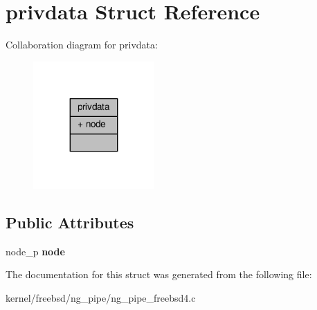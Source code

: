 \hypertarget{structprivdata}{\section{privdata Struct Reference}
\label{structprivdata}
}


Collaboration diagram for privdata\+:
\nopagebreak
\begin{figure}[H]
\begin{center}
\leavevmode
\includegraphics[width=131pt]{structprivdata__coll__graph}
\end{center}
\end{figure}
\subsection*{Public Attributes}
\begin{DoxyCompactItemize}
\item 
\hypertarget{structprivdata_a3f74e5f354d6a3b12e36cb8b12550713}{node\+\_\+p {\bfseries node}}\label{structprivdata_a3f74e5f354d6a3b12e36cb8b12550713}

\end{DoxyCompactItemize}


The documentation for this struct was generated from the following file\+:\begin{DoxyCompactItemize}
\item 
kernel/freebsd/ng\+\_\+pipe/ng\+\_\+pipe\+\_\+freebsd4.\+c\end{DoxyCompactItemize}
